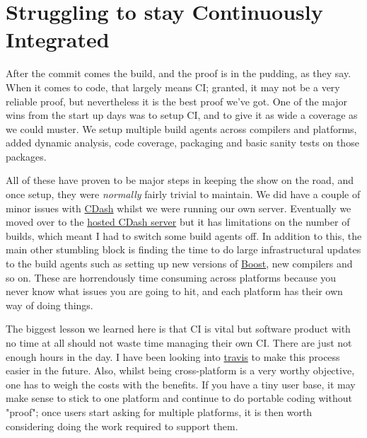 \documentclass{book}
\begin{document}
\section*{Struggling to stay Continuously Integrated}
\label{sec-4}

After the commit comes the build, and the proof is in the pudding, as
they say. When it comes to code, that largely means CI; granted, it
may not be a very reliable proof, but nevertheless it is the best
proof we've got. One of the major wins from the start up days was to
setup CI, and to give it as wide a coverage as we could muster. We
setup multiple build agents across compilers and platforms, added
dynamic analysis, code coverage, packaging and basic sanity tests on
those packages.

All of these have proven to be major steps in keeping the show on the
road, and once setup, they were \emph{normally} fairly trivial to
maintain. We did have a couple of minor issues with \href{http://www.cdash.org/}{CDash} whilst we
were running our own server. Eventually we moved over to the \href{http://my.cdash.org/index.php?project\%3DDogen}{hosted
CDash server} but it has limitations on the number of builds, which
meant I had to switch some build agents off. In addition to this, the
main other stumbling block is finding the time to do large
infrastructural updates to the build agents such as setting up new
versions of \href{http://www.boost.org/users/history/version_1_56_0.html}{Boost}, new compilers and so on. These are horrendously
time consuming across platforms because you never know what issues you
are going to hit, and each platform has their own way of doing things.

The biggest lesson we learned here is that CI is vital but software
product with no time at all should not waste time managing their own
CI. There are just not enough hours in the day. I have been looking
into \href{https://travis-ci.org/}{travis} to make this process easier in the future. Also, whilst
being cross-platform is a very worthy objective, one has to weigh the
costs with the benefits. If you have a tiny user base, it may make
sense to stick to one platform and continue to do portable coding
without "proof"; once users start asking for multiple platforms, it is
then worth considering doing the work required to support them.
\end{document}
